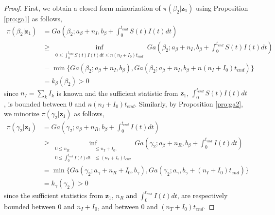 \documentclass[12pt]{article}
\begin{document}
\begin{proof}
	First, we obtain a closed form minorization of $\pi(\beta_2| \mathbf{z}_1)$ using Proposition \ref{pro:ga1} as follows,
	\begin{align*}
		\pi(\beta_2| \mathbf{z}_1) 
		& = Ga\left(\beta_2; a_{\beta} + n_I, b_{\beta} + \int_{0}^{t_{end}}S(t)I(t)dt\right) \\
		& \ge \inf_{\begin{aligned}
				0\le \int_{0}^{t_{end}} S(t)I(t)dt \le n(n_I+I_0) t_{end}
		\end{aligned}}   Ga\left(\beta_2; a_{\beta} + n_I, b_{\beta} + \int_{0}^{t_{end}}S(t)I(t)dt\right) \\
		& = \min\{Ga(\beta_2;a_{\beta}+n_I, b_{\beta}), Ga(\beta_2;a_{\beta}+n_I,b_{\beta}+n(n_I+I_0) t_{end})\} \\
		& = k_\beta(\beta_2) > 0
	\end{align*}
	since $n_I = \sum_k I_k$ is known and the sufficient statistic from $\mathbf{z}_1$, 
	$\int_{0}^{t_{end}}S(t)I(t)dt$, is bounded between $0$ and $n (n_I+I_0)t_{end}$. Similarly, by Proposition \ref{pro:ga2}, we minorize $\pi(\gamma_2| \mathbf{z}_1)$ as follows,
	\begin{align*}
		\pi(\gamma_2| \mathbf{z}_1) 
		& = Ga\left(\gamma_2; a_{\beta} + n_R, b_{\beta} + \int_{0}^{t_{end}}I(t)dt\right)  \\
		& \ge \inf_{\begin{aligned}
				0 \le n_R &\le n_I + I_0, \\
				0 \le \int_{0}^{t_{end}} I(t)dt &\le (n_I+I_0) t_{end}
		\end{aligned}} Ga\left(\gamma_2; a_{\beta} + n_R, b_{\beta} + \int_{0}^{t_{end}}I(t)dt\right) \\
		& = \min\{		Ga(\gamma_2;a_{\gamma}+n_R+I_0,b_{\gamma}), Ga(\gamma_2;a_{\gamma},b_{\gamma}+(n_I+I_0) t_{end})\} \\
		& = k_\gamma(\gamma_2) > 0
	\end{align*}
	since the sufficient statistics from $\mathbf{z}_1$, $n_R$ and $\int_{0}^{t_{end}}I(t)dt$, are respectively bounded between $0$ and $n_I + I_0$, and between $0$ and $(n_T+I_0) t_{end}$.
	

\end{proof}
\end{document}

